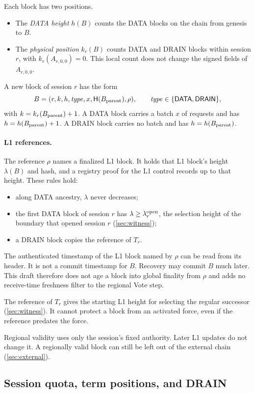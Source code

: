 \documentclass[11pt,a4paper]{article}
\newcommand{\Hash}{\mathsf H}
\newcommand{\tagg}[1]{\ensuremath{\mathsf{#1}}}
\begin{document}
Each block has two positions.
\begin{itemize}
\item The \emph{DATA height} $h(B)$ counts the DATA blocks on the chain
from genesis to $B$.
\item The \emph{physical position} $k_r(B)$ counts DATA and DRAIN blocks
within session $r$, with $k_r(A_{r,0,0})=0$. This local count does not change
the signed fields of $A_{r,0,0}$.
\end{itemize}
A new block of session $r$ has the form
\[
 B=(r,k,h,\mathit{type},x,\Hash(B_{\rm parent}),\rho),
 \qquad \mathit{type}\in\{\tagg{DATA},\tagg{DRAIN}\},
\]
with $k=k_r(B_{\rm parent})+1$. A DATA block carries a batch $x$ of
requests and has $h=h(B_{\rm parent})+1$. A DRAIN block carries no batch
and has $h=h(B_{\rm parent})$.

\paragraph{L1 references.}
The reference $\rho$ names a finalized L1 block. It holds that L1
block's height $\lambda(B)$ and hash, and a registry proof for the L1
control records up to that height. These rules hold:
\begin{itemize}
\item along DATA ancestry, $\lambda$ never decreases;
\item the first DATA block of session $r$ has $\lambda\ge
\lambda^{\rm open}_r$, the selection height of the boundary that opened
session $r$ (\cref{sec:witness});
\item a DRAIN block copies the reference of $T_r$.
\end{itemize}
The authenticated timestamp of the L1 block named by $\rho$ can be
read from its header. It is not a commit timestamp for $B$. Recovery
may commit $B$ much later. This draft therefore does not age a block
into global finality from $\rho$ and adds no receive-time freshness
filter to the regional Vote step.

The reference of $T_r$ gives the starting L1 height for selecting the
regular successor (\cref{sec:witness}). It cannot protect a block from
an activated force, even if the reference predates the force.

Regional validity uses only the session's fixed authority. Later L1
updates do not change it. A regionally valid block can still be left out
of the external chain (\cref{sec:external}).

\subsection{Session quota, term positions, and DRAIN}
\label{sec:quota}
\end{document}
